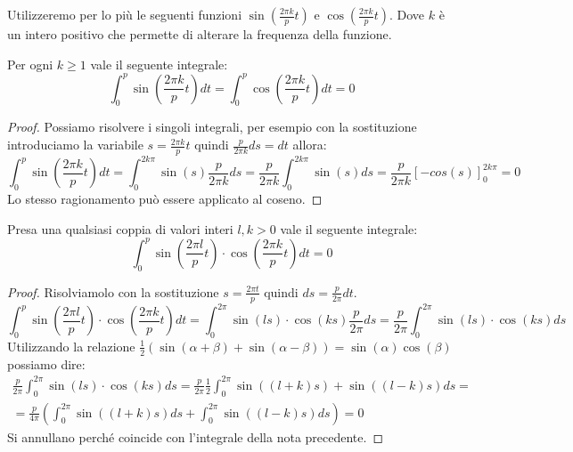 Utilizzeremo per lo più le seguenti funzioni $\sin\left(\frac{2\pi k}{p}t\right)$
e $\cos \left(\frac{2\pi k}{p}t\right)$. Dove $k$ è un intero positivo che permette
di alterare la frequenza della funzione.
\begin{proposizione}\label{prop:integrali_sinusoidi}
    Per ogni $k \geq 1$ vale il seguente integrale:
    \begin{equation*}
        \int_{0}^{p}\sin \left(\frac{2\pi k}{p}t\right) dt =
        \int_{0}^{p}\cos \left(\frac{2\pi k}{p}t\right) dt = 0
    \end{equation*}
    \begin{proof}
        Possiamo risolvere i singoli integrali, per esempio con la sostituzione
        introduciamo la variabile $s= \frac{2\pi k}{p}t$ quindi $\frac{p}{2\pi k}ds =dt$
        allora:
        \begin{equation*}
            \int_{0}^{p}\sin \left(\frac{2\pi k}{p}t\right) dt =
            \int_{0}^{2k\pi}\sin \left(s\right)\frac{p}{2\pi k}ds =
            \frac{p}{2\pi k} \int_{0}^{2k\pi}\sin \left(s\right)ds =
            \frac{p}{2\pi k} \left[-cos(s)\right]_0^{2k\pi} = 0
        \end{equation*}
        Lo stesso ragionamento può essere applicato al coseno.
    \end{proof}
\end{proposizione}
\begin{proposizione}
    Presa una qualsiasi coppia di valori interi $l, k > 0$ vale il seguente integrale:
    \begin{equation}
        \int_{0}^{p}\sin\left(\frac{2\pi l}{p}t\right) \cdot \cos\left(\frac{2\pi k}{p}t\right) dt = 0
    \end{equation}
    \begin{proof}
        Risolviamolo con la sostituzione $s= \frac{2\pi t}{p}$ quindi $ds = \frac{p}{2\pi}dt$.
        \begin{equation*}
            \int_{0}^{p}\sin\left(\frac{2\pi l}{p}t\right)\cdot \cos\left(\frac{2\pi k}{p}t\right) dt =
            \int_{0}^{2\pi}\sin\left(ls\right)\cdot \cos\left(ks\right)\frac{p}{2\pi} ds =
            \frac{p}{2\pi}\int_{0}^{2\pi}\sin\left(ls\right)\cdot \cos\left(ks\right) ds
        \end{equation*}
        Utilizzando la relazione $\frac{1}{2}\left(\sin(\alpha +\beta) +
            \sin(\alpha-\beta)\right) = \sin\left(\alpha\right)\cos\left(\beta\right)$
        possiamo dire:
        \begin{equation*}
            \begin{aligned}
                \frac{p}{2\pi}\int_{0}^{2\pi}\sin\left(ls\right)\cdot \cos\left(ks\right) ds =
                \frac{p}{2\pi}\frac{1}{2}\int_{0}^{2\pi}\sin\left((l+k)s\right)+ \sin\left((l-k)s\right) ds= \\
                =\frac{p}{4\pi}\left(\int_{0}^{2\pi}\sin\left((l+k)s\right)ds + \int_{0}^{2\pi}\sin\left((l-k)s\right) ds\right)=0
            \end{aligned}
        \end{equation*}
        Si annullano perché coincide con l'integrale della nota precedente.
    \end{proof}
\end{proposizione}
